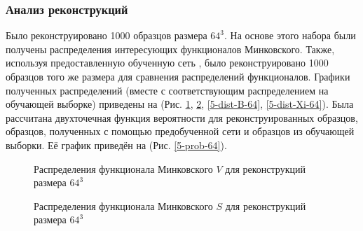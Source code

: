 		\subsubsection{Анализ реконструкций}
			Было реконструировано 1000 образцов размера $64^3$. На основе этого набора были получены распределения интересующих функционалов Минковского. Также, используя предоставленную обученную сеть \cite{Mosser}, было реконструировано 1000 образцов того же размера для сравнения распределений функционалов. Графики полученных распределений (вместе с соответствующим распределением на обучающей выборке) приведены на (Рис. \ref{5-dist-V-64}, \ref{5-dist-S-64}, \ref{5-dist-B-64}, \ref{5-dist-Xi-64}). Была рассчитана двухточечная функция вероятности для реконструированных образцов, образцов, полученных с помощью предобученной сети \cite{Mosser} и образцов из обучающей выборки. Её график приведён на (Рис. \ref{5-prob-64}).
			
			\begin{figure}[h]
				\begin{minipage}[h]{0.49\linewidth}
				\end{minipage}
				\hfill
				\begin{minipage}[h]{0.49\linewidth}
				\end{minipage}
				\caption{Распределения функционала Минковского $V$ для реконструкций размера $64^3$}
				\label{5-dist-V-64}
			\end{figure}
		
			\begin{figure}[h]
				\begin{minipage}[h]{0.49\linewidth}
				\end{minipage}
				\hfill
				\begin{minipage}[h]{0.49\linewidth}
				\end{minipage}
				\caption{Распределения функционала Минковского $S$ для реконструкций размера $64^3$}
				\label{5-dist-S-64}
			\end{figure}
		
